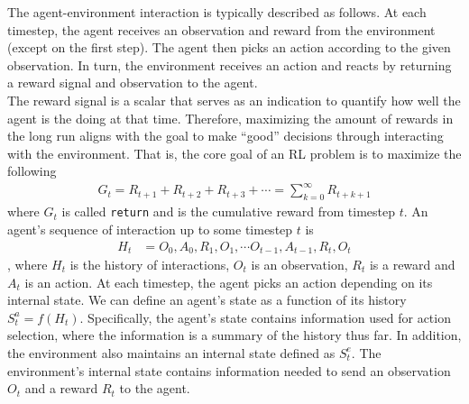 \documentclass[12pt]{report}
\begin{document}
The agent-environment interaction is typically described as follows. At each timestep, the agent receives an observation and reward from the environment (except on the first step). The agent then picks an action according to the given observation. In turn, the environment receives an action and reacts by returning a reward signal and observation to the agent.\\

The reward signal is a scalar that serves as an indication to quantify how well the agent is the doing at that time. Therefore, maximizing the amount of rewards in the long run aligns with the goal to make ``good'' decisions through interacting with the environment. That is, the core goal of an RL problem is to maximize the following
\begin{align}
    G_t = R_{t+1} + R_{t+2} + R_{t+3} + \cdots = \sum_{k=0}^\infty R_{t+k+1} \label{eq:gamma1-return}
\end{align}
where $G_t$ is called \texttt{return} and is the cumulative reward from timestep $t$. An agent's sequence of interaction up to some timestep $t$ is
\begin{align}
    H_t &= O_0, A_0, R_1, O_1, \cdots O_{t-1}, A_{t-1}, R_t, O_t\nonumber
\end{align}
, where $H_t$ is the history of interactions, $O_t$ is an observation, $R_t$ is a reward and $A_t$ is an action. At each timestep, the agent picks an action depending on its internal state. We can define an agent's state as a function of its history $S_t^a = f(H_t)$. Specifically, the agent's state contains information used for action selection, where the information is a summary of the history thus far. In addition, the environment also maintains an internal state defined as $S_t^e$. The environment's internal state contains information needed to send an observation $O_t$ and a reward $R_t$ to the agent.\\
\end{document}
